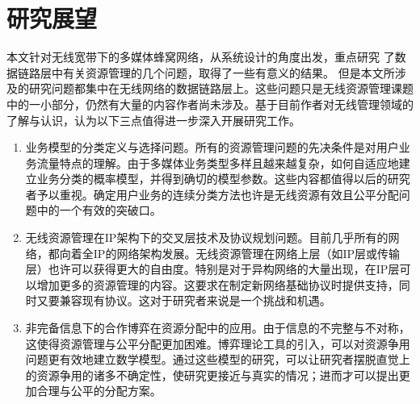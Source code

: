 \section{研究展望}
本文针对无线宽带下的多媒体蜂窝网络，从系统设计的角度出发，重点研究
了数据链路层中有关资源管理的几个问题，取得了一些有意义的结果。
但是本文所涉及的研究问题都集中在无线网络的数据链路层上。这些问题只是无线资源管理课题中的一小部分，仍然有大量的内容作者尚未涉及。基于目前作者对无线管理领域的了解与认识，认为以下三点值得进一步深入开展研究工作。
\begin{enumerate}[(1)]
\item 业务模型的分类定义与选择问题。所有的资源管理问题的先决条件是对用户业务流量特点的理解。由于多媒体业务类型多样且越来越复杂，如何自适应地建立业务分类的概率模型，并得到确切的模型参数。这些内容都值得以后的研究者予以重视。确定用户业务的连续分类方法也许是无线资源有效且公平分配问题中的一个有效的突破口。
\item 无线资源管理在IP架构下的交叉层技术及协议规划问题。目前几乎所有的网络，都向着全IP的网络架构发展。无线资源管理在网络上层（如IP层或传输层）也许可以获得更大的自由度。特别是对于异构网络的大量出现，在IP层可以增加更多的资源管理的内容。这要求在制定新网络基础协议时提供支持，同时又要兼容现有协议。这对于研究者来说是一个挑战和机遇。
\item 非完备信息下的合作博弈在资源分配中的应用。由于信息的不完整与不对称，这使得资源管理与公平分配更加困难。博弈理论工具的引入，可以对资源争用问题更有效地建立数学模型。通过这些模型的研究，可以让研究者摆脱直觉上的资源争用的诸多不确定性，使研究更接近与真实的情况；进而才可以提出更加合理与公平的分配方案。
\end{enumerate}

